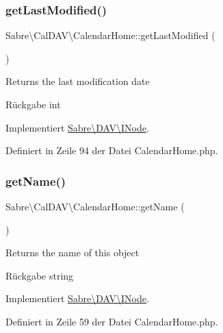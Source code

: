 \subsubsection{\texorpdfstring{get\+Last\+Modified()}{getLastModified()}}
{\footnotesize\ttfamily Sabre\textbackslash{}\+Cal\+D\+A\+V\textbackslash{}\+Calendar\+Home\+::get\+Last\+Modified (\begin{DoxyParamCaption}{ }\end{DoxyParamCaption})}

Returns the last modification date

\begin{DoxyReturn}{Rückgabe}
int 
\end{DoxyReturn}


Implementiert \mbox{\hyperlink{interface_sabre_1_1_d_a_v_1_1_i_node_a06335f81c7d4ec2c6d9e327c8ce61014}{Sabre\textbackslash{}\+D\+A\+V\textbackslash{}\+I\+Node}}.



Definiert in Zeile 94 der Datei Calendar\+Home.\+php.

\mbox{\label{class_sabre_1_1_cal_d_a_v_1_1_calendar_home_a045f3f5d909aaea952bc04b440a88493}} 
\subsubsection{\texorpdfstring{get\+Name()}{getName()}}
{\footnotesize\ttfamily Sabre\textbackslash{}\+Cal\+D\+A\+V\textbackslash{}\+Calendar\+Home\+::get\+Name (\begin{DoxyParamCaption}{ }\end{DoxyParamCaption})}

Returns the name of this object

\begin{DoxyReturn}{Rückgabe}
string 
\end{DoxyReturn}


Implementiert \mbox{\hyperlink{interface_sabre_1_1_d_a_v_1_1_i_node_ab616fe836b1ae36af12126a2bc934dce}{Sabre\textbackslash{}\+D\+A\+V\textbackslash{}\+I\+Node}}.



Definiert in Zeile 59 der Datei Calendar\+Home.\+php.

